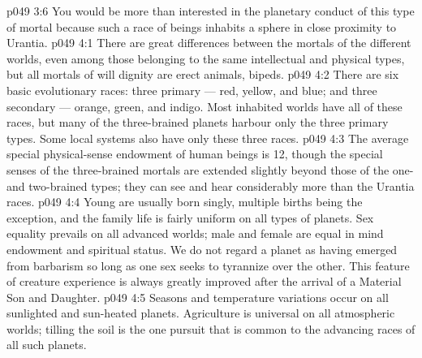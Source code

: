 \vs p049 3:6 You would be more than interested in the planetary conduct of this type of mortal because such a race of beings inhabits a sphere in close proximity to Urantia.
\vs p049 4:1 There are great differences between the mortals of the different worlds, even among those belonging to the same intellectual and physical types, but all mortals of will dignity are erect animals, bipeds.
\vs p049 4:2 There are six basic evolutionary races: three primary --- red, yellow, and blue; and three secondary --- orange, green, and indigo. Most inhabited worlds have all of these races, but many of the three\hyp{}brained planets harbour only the three primary types. Some local systems also have only these three races.
\vs p049 4:3 The average special physical\hyp{}sense endowment of human beings is 12, though the special senses of the three\hyp{}brained mortals are extended slightly beyond those of the one\hyp{} and two\hyp{}brained types; they can see and hear considerably more than the Urantia races.
\vs p049 4:4 Young are usually born singly, multiple births being the exception, and the family life is fairly uniform on all types of planets. Sex equality prevails on all advanced worlds; male and female are equal in mind endowment and spiritual status. We do not regard a planet as having emerged from barbarism so long as one sex seeks to tyrannize over the other. This feature of creature experience is always greatly improved after the arrival of a Material Son and Daughter.
\vs p049 4:5 \pc Seasons and temperature variations occur on all sunlighted and sun\hyp{}heated planets. Agriculture is universal on all atmospheric worlds; tilling the soil is the one pursuit that is common to the advancing races of all such planets.
